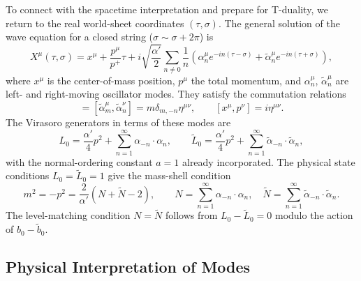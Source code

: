 \documentclass[11pt]{article}
\renewcommand{\tilde}{\widetilde}
\begin{document}
To connect with the spacetime interpretation and prepare for T-duality, we return to the real world-sheet coordinates $(\tau,\sigma)$. The general solution of the wave equation for a closed string ($\sigma \sim \sigma + 2\pi$) is
\begin{equation}
X^\mu(\tau,\sigma) = x^\mu + \frac{p^\mu}{p^+} \tau + i \sqrt{\frac{\alpha'}{2}} \sum_{n\neq 0} \frac{1}{n} \left( \alpha_n^\mu e^{-in(\tau-\sigma)} + \tilde{\alpha}_n^\mu e^{-in(\tau+\sigma)} \right),
\end{equation}
where $x^\mu$ is the center-of-mass position, $p^\mu$ the total momentum, and $\alpha_n^\mu$, $\tilde{\alpha}_n^\mu$ are left- and right-moving oscillator modes. They satisfy the commutation relations
\begin{equation}
[\alpha_m^\mu, \alpha_n^\nu] = [\tilde{\alpha}_m^\mu, \tilde{\alpha}_n^\nu] = m \delta_{m,-n} \eta^{\mu\nu}, \qquad [x^\mu, p^\nu] = i \eta^{\mu\nu}.
\end{equation}
The Virasoro generators in terms of these modes are
\begin{equation}
L_0 = \frac{\alpha'}{4} p^2 + \sum_{n=1}^\infty \alpha_{-n} \cdot \alpha_n, \qquad \tilde{L}_0 = \frac{\alpha'}{4} p^2 + \sum_{n=1}^\infty \tilde{\alpha}_{-n} \cdot \tilde{\alpha}_n,
\end{equation}
with the normal-ordering constant $a=1$ already incorporated. The physical state conditions $L_0 = \tilde{L}_0 = 1$ give the mass-shell condition
\begin{equation}
m^2 = -p^2 = \frac{2}{\alpha'} (N + \tilde{N} - 2), \qquad N = \sum_{n=1}^\infty \alpha_{-n} \cdot \alpha_n, \quad \tilde{N} = \sum_{n=1}^\infty \tilde{\alpha}_{-n} \cdot \tilde{\alpha}_n.
\end{equation}
The level-matching condition $N = \tilde{N}$ follows from $L_0 - \tilde{L}_0 = 0$ modulo the action of $b_0 - \tilde{b}_0$.

\subsection{Physical Interpretation of Modes}
\end{document}
